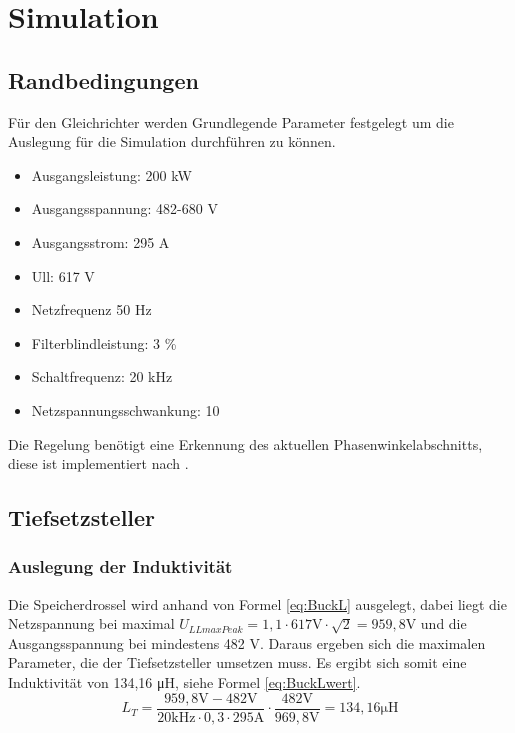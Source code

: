 \chapter{Simulation}


\section{Randbedingungen}
Für den Gleichrichter werden Grundlegende Parameter festgelegt um die Auslegung für die Simulation durchführen zu können. 

\begin{itemize}
	\item Ausgangsleistung: 200 kW
	\item Ausgangsspannung: 482-680 V
	\item Ausgangsstrom: 	295 A
	\item \gls{Ull}:		617 V
	\item Netzfrequenz		50 Hz
	\item Filterblindleistung: 3 \%
	\item Schaltfrequenz: 20 kHz
	\item Netzspannungsschwankung: 10%
\end{itemize}

Die Regelung benötigt eine Erkennung des aktuellen Phasenwinkelabschnitts, diese ist implementiert nach \cite{InstituteofElectricalandElectronicsEngineers}.

\section{Tiefsetzsteller}

	\subsection{Auslegung der Induktivität}
	Die Speicherdrossel wird anhand von Formel \ref{eq:BuckL} ausgelegt, dabei liegt die Netzspannung bei maximal $ U_{LLmaxPeak}=1,1 \cdot 617 \si{\V} \cdot \sqrt{2}=959,8 \si{\V} $ und die Ausgangsspannung bei mindestens 482 V. Daraus ergeben sich die maximalen Parameter, die der Tiefsetzsteller umsetzen muss. Es ergibt sich somit eine Induktivität von 134,16 \si{\micro \henry}, siehe Formel \ref{eq:BuckLwert}.
	 \begin{equation}
	 	\label{eq:BuckLwert}
	 	L_{T}=\dfrac{959,8\si{\V} - 482 \si{\V}}{20 \si{\kilo \hertz}\cdot 0,3 \cdot 295 \si{\A}}\cdot \dfrac{482 \si{\V}}{969,8 \si{\V}}= 134,16 \si{\micro \henry} 
	 \end{equation}

